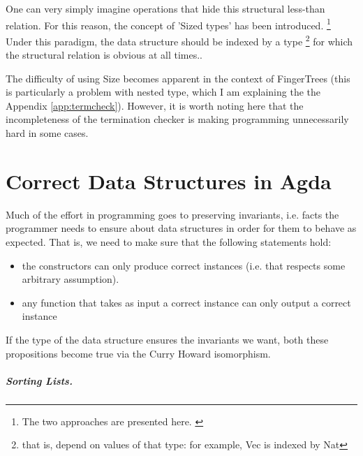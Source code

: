 \documentclass[12pt,twoside,notitlepage]{report}
\begin{document}
One can very simply imagine operations that hide this structural less-than relation. For this reason, the concept of 'Sized types' has been introduced. \footnote{The two approaches are presented here. \cite{termination}} Under this paradigm, the data structure should be indexed by a type \footnote{that is, depend on values of that type: for example, Vec is indexed by Nat} for which the structural relation is obvious at all times.\cite{sizedtypes}. 

The difficulty of using Size becomes apparent in the context of FingerTrees (this is particularly a problem with nested type, which I am explaining the the Appendix \ref{app:termcheck}). However, it is worth noting here that the incompleteness \cite{certified}  of the termination checker is making programming unnecessarily hard in some cases. 

\section{Correct Data Structures in Agda}

Much of the effort in programming goes to preserving invariants, i.e. facts the programmer needs to ensure about data structures in order for them to behave as expected. 
That is, we need to make sure that the following statements hold:
\begin{itemize}
\item the constructors can only produce correct instances (i.e. that respects some arbitrary assumption).
\item any function that takes as input a correct instance can only output a correct instance
\end{itemize}

If the type of the data structure ensures the invariants we want, both these propositions become true via the Curry Howard isomorphism.

\subparagraph{Sorting Lists.}
\end{document}
